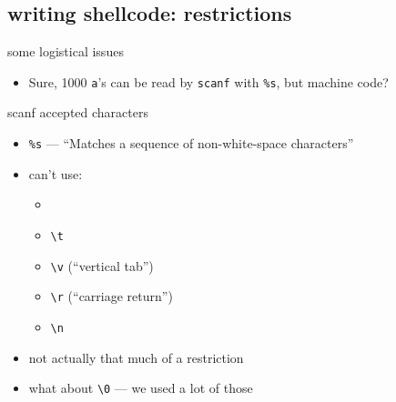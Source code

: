 \subsection{writing shellcode: restrictions}

\begin{frame}{some logistical issues}
    \begin{itemize}
    \item Sure, 1000 {\tt a}'s can be read by {\tt scanf} with {\tt \%s}, but machine code?
    \end{itemize}
\end{frame}

\begin{frame}{scanf accepted characters}
    \begin{itemize}
    \item {\tt \%s} --- ``Matches a sequence of non-white-space characters''
    \item can't use:
        \begin{itemize}
        \item {\tt\textvisiblespace}
        \item {\tt\textbackslash t}
        \item {\tt\textbackslash v} (``vertical tab'')
        \item {\tt\textbackslash r} (``carriage return'')
        \item {\tt\textbackslash n}
        \end{itemize}
    \item not actually that much of a restriction
    \item what about {\tt \textbackslash 0} --- we used a lot of those
    \end{itemize}
\end{frame}

